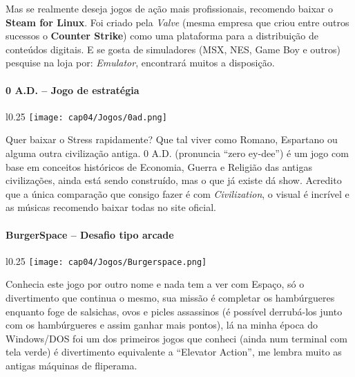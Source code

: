 Mas se realmente deseja jogos de ação mais profissionais, recomendo baixar o \textbf{Steam for Linux}. Foi criado pela \textit{Valve} (mesma empresa que criou entre outros sucessos o \textbf{Counter Strike}) como uma plataforma para a distribuição de conteúdos digitais. E se gosta de simuladores (MSX, NES, Game Boy e outros) pesquise na loja por: \textit{Emulator}, encontrará muitos a disposição.

\paragraph{0 A.D. – Jogo de estratégia}
\begin{minipage}{\linewidth}
 \vspace{5pt}
 \begin{wrapfigure}{l}{0.25\textwidth}
  \vspace{-\baselineskip}
  \texttt{[image: cap04/Jogos/0ad.png]} 
 \end{wrapfigure}
 Quer baixar o Stress rapidamente? Que tal viver como Romano, Espartano ou alguma outra civilização antiga. 0 A.D. (pronuncia ``zero ey-dee'') é um jogo com base em conceitos históricos de Economia, Guerra e Religião das antigas civilizações, ainda está sendo construído, mas o que já existe dá show. Acredito que a única comparação que consigo fazer é com \textit{Civilization}, o visual é incrível e as músicas recomendo baixar todas no site oficial.
\end{minipage}

\paragraph{BurgerSpace – Desafio tipo arcade}
\begin{minipage}{\linewidth}
 \vspace{5pt}
 \begin{wrapfigure}{l}{0.25\textwidth}
  \vspace{-\baselineskip}
  \texttt{[image: cap04/Jogos/Burgerspace.png]} 
 \end{wrapfigure}
 Conhecia este jogo por outro nome e nada tem a ver com Espaço, só o divertimento que continua o mesmo, sua missão é completar os hambúrgueres enquanto foge de salsichas, ovos e picles assassinos (é possível derrubá-los junto com os hambúrgueres e assim ganhar mais pontos), lá na minha época do Windows/DOS foi um dos primeiros jogos que conheci (ainda num terminal com tela verde) é divertimento equivalente a ``Elevator Action'', me lembra muito as antigas máquinas de fliperama.
\end{minipage}

